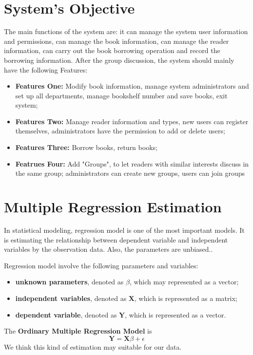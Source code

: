 \section{System's Objective} %

The main functions of the system are: it can manage the system user information and permissions, can manage the book information, can manage the reader information, can carry out the book borrowing operation and record the borrowing information. After the group discussion, the system should mainly have the following Features:

\begin{itemize}
    \item \textbf{Features One:} Modify book information, manage system administrators and set up all departments, manage bookshelf number and save books, exit system;
    \item \textbf{Features Two:} Manage reader information and types, new users can register themselves, administrators have the permission to add or delete users;
    \item \textbf{Features Three:} Borrow books, return books;
    \item \textbf{Featrues Four:} Add "Groups", to let readers with similar interests discuss in the same group; administrators can create new groups, users can join groups
\end{itemize}

\section{Multiple Regression Estimation}

In statistical modeling, regression model is one of the most important models. It is estimating the relationship between dependent variable and independent variables by the observation data. Also, the parameters are unbiased.\citep{montgomery2012introduction}.

Regression model involve the following parameters and variables:
\begin{itemize}
    \item \textbf{unknown parameters}, denoted as $\beta$, which may represented as a vector;
    \item \textbf{independent variables}, denoted as $\mathbf{X}$, which is represented as a matrix;
    \item \textbf{dependent variable}, denoted as $\mathbf{Y}$, which is represented as a vector.
\end{itemize}
The \textbf{Ordinary Multiple Regression Model} is
$$
  \mathbf{Y} = \mathbf{X} \beta + \epsilon
$$
We think this kind of estimation may suitable for our data.
